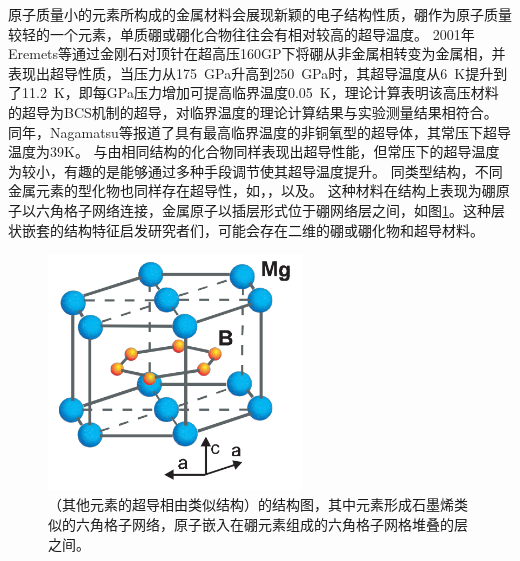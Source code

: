 原子质量小的元素所构成的金属材料会展现新颖的电子结构性质，硼作为原子质量较轻的一个元素，单质硼或硼化合物往往会有相对较高的超导温度。
2001年Eremets等\cite{eremets2001superconductivity}通过金刚石对顶针在超高压160GP下将硼从非金属相转变为金属相，并表现出超导性质，当压力从\SI{175}{\GPa}升高到\SI{250}{\GPa}时，其超导温度从\SI{6}{\kelvin}提升到了\SI{11.2}{\kelvin}，即每\si{\GPa}压力增加可提高临界温度\SI{0.05}{\kelvin}，理论计算表明该高压材料的超导为BCS机制的超导，对临界温度的理论计算结果与实验测量结果相符合。
同年，Nagamatsu等\cite{nagamatsu2001superconductivity}报道了具有最高临界温度的非铜氧型的超导体\cite{buzea2001review}，其常压下超导温度为39K。
与由相同结构的化合物同样表现出超导性能，但常压下的超导温度为较小，有趣的是能够通过多种手段调节使其超导温度提升。
同类型结构，不同金属元素的型化物也同样存在超导性，如，\cite{barbero2017doping}，\cite{mudgel2008superconductivity}以及\cite{singh2001superconductivity}。
这种材料在结构上表现为硼原子以六角格子网络连接，金属原子以插层形式位于硼网络层之间，如图\ref{fig:ch1_mgb2}。这种层状嵌套的结构特征启发研究者们，可能会存在二维的硼或硼化物和超导材料。

\begin{figure}[bt]
  \includegraphics[width=0.60\textwidth]{figs/ch1_mgb2.png}
  \centering
  \caption{（其他元素的超导相由类似结构）的结构图，其中元素形成石墨烯类似的六角格子网络，原子嵌入在硼元素组成的六角格子网格堆叠的层之间。}
  \label{fig:ch1_mgb2}
\end{figure}

